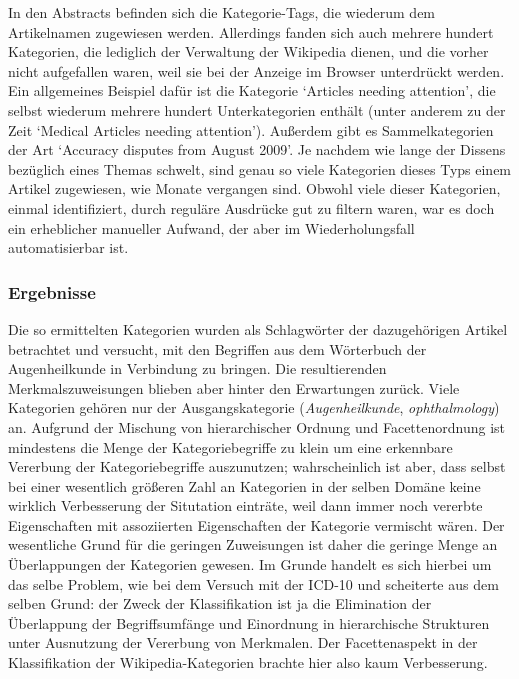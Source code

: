 \documentclass[pagesize,DIV=calc,12pt,draft]{scrreprt}
\begin{document}
\begin{inparaenum}
\item In den Abstracts befinden sich die Kategorie-Tags, die wiederum dem
  Artikelnamen zugewiesen werden. Allerdings fanden sich auch mehrere
  hundert Kategorien, die lediglich der Verwaltung der Wikipedia dienen,
  und die vorher nicht aufgefallen waren, weil sie bei der Anzeige im
  Browser unterdrückt werden. Ein allgemeines Beispiel dafür ist die
  Kategorie `Articles needing attention', die selbst wiederum mehrere
  hundert Unterkategorien enthält (unter anderem zu der Zeit `Medical
  Articles needing attention'). Außerdem gibt es Sammelkategorien der
  Art `Accuracy disputes from August 2009'. Je nachdem wie lange der
  Dissens bezüglich eines Themas schwelt, sind genau so viele Kategorien
  dieses Typs einem Artikel zugewiesen, wie Monate vergangen sind.
  Obwohl viele dieser Kategorien, einmal identifiziert, durch reguläre
  Ausdrücke gut zu filtern waren, war es doch ein erheblicher manueller
  Aufwand, der aber im Wiederholungsfall automatisierbar ist.
\end{inparaenum}

\subsubsection{Ergebnisse}

Die so ermittelten Kategorien wurden als Schlagwörter der dazugehörigen
Artikel betrachtet und versucht, mit den Begriffen aus dem Wörterbuch
der Augenheilkunde in Verbindung zu bringen. Die resultierenden
Merkmalszuweisungen blieben aber hinter den Erwartungen zurück. Viele
Kategorien gehören nur der Ausgangskategorie (\emph{Augenheilkunde},
\emph{ophthalmology}) an. Aufgrund der Mischung von hierarchischer
Ordnung und Facettenordnung ist mindestens die Menge der
Kategoriebegriffe zu klein um eine erkennbare Vererbung der
Kategoriebegriffe auszunutzen; wahrscheinlich ist aber, dass selbst bei
einer wesentlich größeren Zahl an Kategorien in der selben Domäne keine
wirklich Verbesserung der Situtation einträte, weil dann immer noch
vererbte Eigenschaften mit assoziierten Eigenschaften der Kategorie
vermischt wären. Der wesentliche Grund für die geringen Zuweisungen ist
daher die geringe Menge an Überlappungen der Kategorien gewesen. Im
Grunde handelt es sich hierbei um das selbe Problem, wie bei dem Versuch
mit der ICD-10 und scheiterte aus dem selben Grund: der Zweck der
Klassifikation ist ja die Elimination der Überlappung der
Begriffsumfänge und Einordnung in hierarchische Strukturen unter
Ausnutzung der Vererbung von Merkmalen. Der Facettenaspekt in der
Klassifikation der Wikipedia-Kategorien brachte hier also kaum
Verbesserung.
\end{document}
